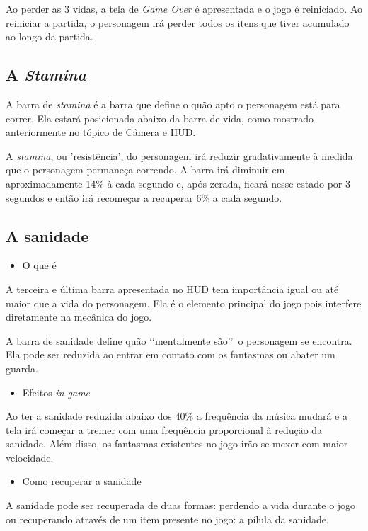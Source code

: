 Ao perder as 3 vidas, a tela de \textit{Game Over} é apresentada e o jogo é reiniciado. Ao reiniciar a partida, o personagem irá perder todos os itens que tiver acumulado ao longo da partida.

\subsection{A \textit{Stamina}}
A barra de \textit{stamina} é a barra que define o quão apto o personagem está para correr. Ela estará posicionada abaixo da barra de vida, como mostrado anteriormente no tópico de Câmera e HUD.

A \textit{stamina}, ou 'resistência', do personagem irá reduzir gradativamente à medida que o personagem permaneça correndo. A barra irá diminuir em aproximadamente 14\% à cada segundo e, após zerada, ficará nesse estado por 3 segundos e então irá recomeçar a recuperar 6\% a cada segundo.

\subsection{A sanidade}
\begin{itemize}
\item O que é
\end{itemize}
A terceira e última barra apresentada no HUD tem importância igual ou até maior que a vida do personagem. Ela é o elemento principal do jogo pois interfere diretamente na mecânica do jogo. 

A barra de sanidade define quão \lq\lq mentalmente são\rq\rq\ o personagem se encontra. Ela pode ser reduzida ao entrar em contato com os fantasmas ou abater um guarda. 

\begin{itemize}
\item Efeitos \textit{in game}
\end{itemize}
Ao ter a sanidade reduzida abaixo dos 40\% a frequência da música mudará e a tela irá começar a tremer com uma frequência proporcional à redução da sanidade. Além disso, os fantasmas existentes no jogo irão se mexer com maior velocidade.

\begin{itemize}
\item Como recuperar a sanidade
\end{itemize}

A sanidade pode ser recuperada de duas formas: perdendo a vida durante o jogo ou recuperando através de um item presente no jogo: a pílula da sanidade.

